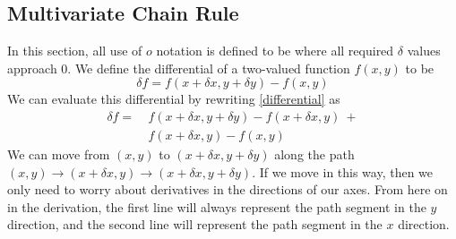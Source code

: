 \documentclass{article}
\begin{document}
\subsection{Multivariate Chain Rule}
In this section, all use of $o$ notation is defined to be where all required $\delta$ values approach 0. We define the differential of a two-valued function $f(x, y)$ to be
\begin{equation}\label{differential}
    \delta f = f(x + \delta x, y + \delta y) - f(x, y)
\end{equation}
We can evaluate this differential by rewriting \eqref{differential} as
\begin{align*}
    \delta f =\  & f(x + \delta x, y + \delta y) - f(x + \delta x, y)\ + \\
                 & f(x + \delta x, y) - f(x, y)
\end{align*}
We can move from $(x, y)$ to $(x + \delta x, y + \delta y)$ along the path $(x, y) \to (x + \delta x, y) \to (x + \delta x, y + \delta y)$. If we move in this way, then we only need to worry about derivatives in the directions of our axes. From here on in the derivation, the first line will always represent the path segment in the $y$ direction, and the second line will represent the path segment in the $x$ direction.
\end{document}
